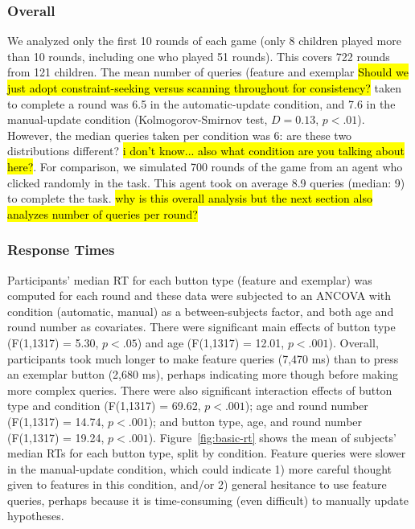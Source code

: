 \documentclass[10pt,letterpaper]{article}
\begin{document}
\subsubsection{Overall}

We analyzed only the first 10 rounds of each game (only 8 children played more than 
10 rounds, including one who played 51 rounds). This covers 722 rounds from 121 
children. The mean number of queries (feature 
and exemplar \hl{Should we just adopt constraint-seeking versus scanning throughout for consistency?} taken to complete a round was 6.5 in the automatic-update condition, 
and 7.6 in the manual-update condition (Kolmogorov-Smirnov test, $D = 
0.13$, $p<.01$). However, the median queries taken per 
condition was 6: are these two distributions different? \hl{i don't know... also what
condition are you talking about here?}.  For comparison, 
we simulated 700 rounds of the game from an agent who clicked
randomly in the task.  This agent took on average 8.9 queries (median: 9) to complete the
task.  \hl{why is this overall analysis but the next section also analyzes
number of queries per round?}

\subsubsection{Response Times}

Participants' median RT for each button type (feature and exemplar) was computed 
for each round and these data were subjected to an ANCOVA with condition (automatic, manual) as a 
between-subjects factor, and both age and round number as covariates. There
were significant main effects of button type (F(1,1317) = 5.30, $p<.
05$) and age (F(1,1317) = 12.01, $p<.001$). Overall, participants took much longer to 
make feature queries (7,470 ms) than to press an exemplar button (2,680 ms), 
perhaps indicating more though before making more complex queries. There were also significant 
interaction effects of button type and condition (F(1,1317) = 69.62, $p<.001$); age 
and round number (F(1,1317) = 14.74, $p<.001$); and button type, age, and round 
number (F(1,1317) = 19.24, $p<.001$). Figure~\ref{fig:basic-rt} shows the mean of 
subjects' median RTs for each button type, split by condition. Feature queries were 
slower in the manual-update condition, which could indicate 1) more careful thought 
given to features in this condition, and/or 2) general hesitance to use feature 
queries, perhaps because it is time-consuming (even difficult) to manually update 
hypotheses. 
\end{document}
